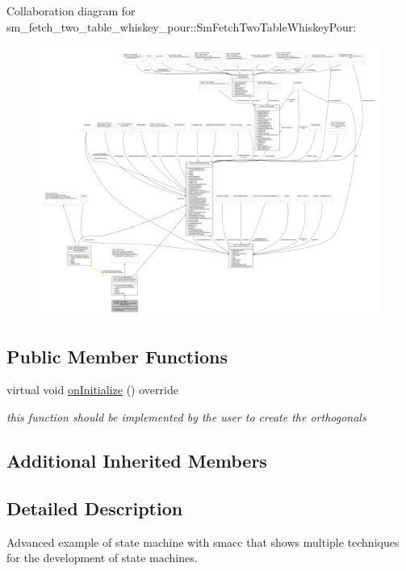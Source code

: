 Collaboration diagram for sm\+\_\+fetch\+\_\+two\+\_\+table\+\_\+whiskey\+\_\+pour\+:\+:Sm\+Fetch\+Two\+Table\+Whiskey\+Pour\+:
\nopagebreak
\begin{figure}[H]
\begin{center}
\leavevmode
\includegraphics[width=350pt]{structsm__fetch__two__table__whiskey__pour_1_1SmFetchTwoTableWhiskeyPour__coll__graph}
\end{center}
\end{figure}
\subsection*{Public Member Functions}
\begin{DoxyCompactItemize}
\item 
virtual void \hyperlink{structsm__fetch__two__table__whiskey__pour_1_1SmFetchTwoTableWhiskeyPour_a7bdeb9c749961c650b0e06e0ff646f5a}{on\+Initialize} () override
\begin{DoxyCompactList}\small\item\em this function should be implemented by the user to create the orthogonals \end{DoxyCompactList}\end{DoxyCompactItemize}
\subsection*{Additional Inherited Members}


\subsection{Detailed Description}
Advanced example of state machine with smacc that shows multiple techniques for the development of state machines. 

